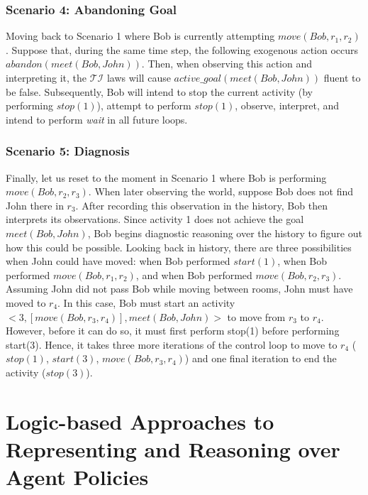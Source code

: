 \subsubsection{Scenario 4: Abandoning Goal~\citep{blount_towards_2014}}
\label{subsubsec:aia_scenario_4}

Moving back to Scenario 1 where Bob is currently attempting $move(Bob, r_1, r_2)$.
Suppose that, during the same time step, the following exogenous action occurs $abandon(meet(Bob, John))$.
Then, when observing this action and interpreting it, the $\mathcal{TI}$ laws will cause $active\_goal(meet(Bob, John))$ fluent to be false.
Subsequently, Bob will intend to stop the current activity (by performing $stop(1)$), attempt to perform $stop(1)$, observe, interpret, and intend to perform \textit{wait} in all future loops.

\subsubsection{Scenario 5: Diagnosis~\citep{blount_towards_2014}}
\label{subsubsec:aia_scenario_5}

Finally, let us reset to the moment in Scenario 1 where Bob is performing $move(Bob, r_2, r_3)$.
When later observing the world, suppose Bob does not find John there in $r_3$.
After recording this observation in the history, Bob then interprets its observations.
Since activity 1 does not achieve the goal $meet(Bob, John)$, Bob begins diagnostic reasoning over the history to figure out how this could be possible.
Looking back in history, there are three possibilities when John could have moved: when Bob performed $start(1)$, when Bob performed $move(Bob, r_1, r_2)$, and when Bob performed $move(Bob, r_2, r_3)$.
Assuming John did not pass Bob while moving between rooms, John must have moved to $r_4$.
In this case, Bob must start an activity $<3, [move(Bob, r_3, r_4)],meet(Bob,John)>$ to move from $r_3$ to $r_4$.
However, before it can do so, it must first perform stop(1) before performing start(3).
Hence, it takes three more iterations of the control loop to move to $r_4$ ($stop(1)$, $start(3)$, $move(Bob, r_3,r_4)$) and one final iteration to end the activity ($stop(3)$).

\section{Logic-based Approaches to Representing and Reasoning over Agent Policies}
\label{sec:policies}

